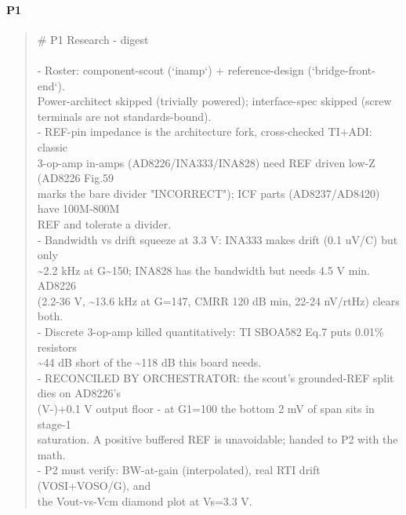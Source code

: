 \documentclass[11pt,a4paper]{article}
\begin{document}
\paragraph*{P1}
\begin{quote}\small\ttfamily\raggedright
\# P1 Research - digest\\
~\\
- Roster: component-scout (`inamp`) + reference-design (`bridge-front-end`).\\
  Power-architect skipped (trivially powered); interface-spec skipped (screw\\
  terminals are not standards-bound).\\
- REF-pin impedance is the architecture fork, cross-checked TI+ADI: classic\\
  3-op-amp in-amps (AD8226/INA333/INA828) need REF driven low-Z (AD8226 Fig.59\\
  marks the bare divider "INCORRECT"); ICF parts (AD8237/AD8420) have 100M-800M\\
  REF and tolerate a divider.\\
- Bandwidth vs drift squeeze at 3.3 V: INA333 makes drift (0.1 uV/C) but only\\
  \textasciitilde{}2.2 kHz at G\textasciitilde{}150; INA828 has the bandwidth but needs 4.5 V min. AD8226\\
  (2.2-36 V, \textasciitilde{}13.6 kHz at G=147, CMRR 120 dB min, 22-24 nV/rtHz) clears both.\\
- Discrete 3-op-amp killed quantitatively: TI SBOA582 Eq.7 puts 0.01\% resistors\\
  \textasciitilde{}44 dB short of the \textasciitilde{}118 dB this board needs.\\
- RECONCILED BY ORCHESTRATOR: the scout's grounded-REF split dies on AD8226's\\
  (V-)+0.1 V output floor - at G1=100 the bottom 2 mV of span sits in stage-1\\
  saturation. A positive buffered REF is unavoidable; handed to P2 with the math.\\
- P2 must verify: BW-at-gain (interpolated), real RTI drift (VOSI+VOSO/G), and\\
  the Vout-vs-Vcm diamond plot at Vs=3.3 V.
\end{quote}
\end{document}
